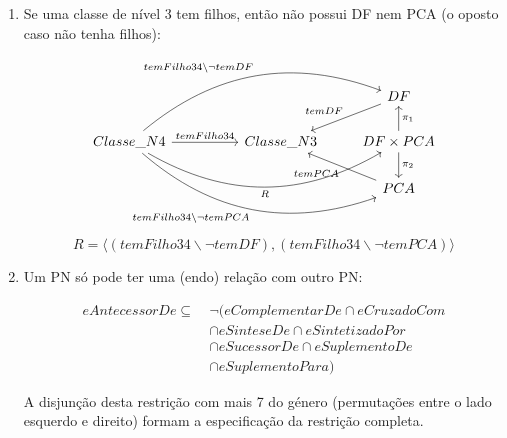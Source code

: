 \documentclass[tikz,runningheads,a4paper]{llncs}
\begin{document}
\begin{enumerate}
    \item Se uma classe de nível 3 tem filhos, então não possui DF nem PCA (o oposto caso não tenha filhos):
    
    \begin{equation}
    \label{inv-3-4}
    \begin{tikzcd}
                                                                                                                                                                                           &  &            & DF \arrow[swap]{ld}{temDF}                                       \\
Classe\_N4 \arrow{rr}{temFilho34} \arrow[bend left]{rrru}{temFilho34\backslash \neg temDF} \arrow[swap, bend right]{rrrd}{temFilho34\backslash \neg temPCA} \arrow[swap, bend right]{rrr}{R} &  & Classe\_N3 & DF \times PCA \arrow[swap]{u}{\pi_1} \arrow{d}{\pi_2} \\
                                                                                                                                                                                           &  &            & PCA \arrow{lu}{temPCA}                                     
\end{tikzcd}
    \end{equation}{}
    \begin{equation*}
        R = \langle (temFilho34\backslash \neg temDF), (temFilho34\backslash \neg temPCA) \rangle
    \end{equation*}{}
    
    \item Um PN só pode ter uma (endo) relação com outro PN:
    
    \begin{equation}
    \begin{split}{}
        eAntecessorDe \subseteq\ & \neg (eComplementarDe \cap eCruzadoCom \\
                                & \cap eSinteseDe \cap eSintetizadoPor \\
                                & \cap eSucessorDe \cap eSuplementoDe \\
                                & \cap eSuplementoPara)
    \end{split}{}
    \end{equation}{}
    
    A disjunção desta restrição com mais 7 do género (permutações entre o lado esquerdo e direito) formam a especificação da restrição completa.
    

\end{enumerate}
\end{document}
